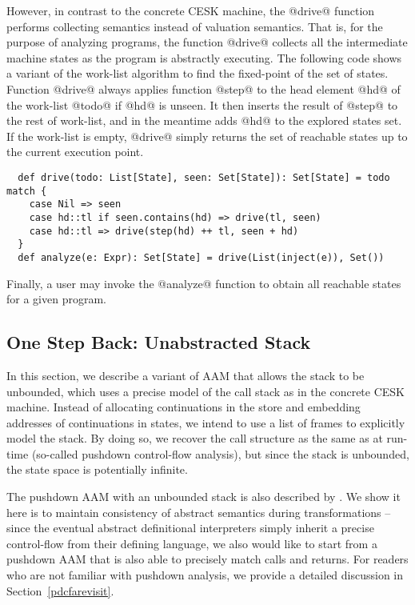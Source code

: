 \documentclass[acmsmall, screen]{acmart}\settopmatter{}
\begin{document}
However, in contrast to the concrete CESK machine, the @drive@ function performs
collecting semantics instead of valuation semantics. That is, for the purpose of
analyzing programs, the function @drive@ collects all the intermediate machine states
as the program is abstractly executing. The following code shows a variant of the
work-list algorithm to find the fixed-point of the set of states.
Function @drive@ always applies function @step@ to the head element @hd@ of
the work-list @todo@ if @hd@ is unseen. It then inserts the result of @step@ to
the rest of work-list, and in the meantime adds @hd@ to the explored states set.
If the work-list is empty, @drive@ simply returns the set of reachable states
up to the current execution point.

\begin{lstlisting}
  def drive(todo: List[State], seen: Set[State]): Set[State] = todo match {
    case Nil => seen
    case hd::tl if seen.contains(hd) => drive(tl, seen)
    case hd::tl => drive(step(hd) ++ tl, seen + hd)
  }
  def analyze(e: Expr): Set[State] = drive(List(inject(e)), Set())
\end{lstlisting}

Finally, a user may invoke the @analyze@ function to obtain all reachable states for
a given program.


\subsection{One Step Back: Unabstracted Stack} \label{unabs}

In this section, we describe a variant of AAM that allows the stack to be unbounded,
which uses a precise model of the call stack as in the concrete CESK machine.
Instead of allocating continuations in the store and embedding addresses of
continuations in states, we intend to use a list of frames to explicitly model
the stack. By doing so, we recover the call structure as the same as at run-time
(so-called pushdown control-flow analysis), but since the stack is unbounded,
the state space is potentially infinite.

The pushdown AAM with an unbounded stack is also described by \citeauthor{van2012systematic}
\cite{van2012systematic}.
We show it here is to maintain consistency of abstract semantics during
transformations -- since the eventual abstract definitional interpreters simply inherit
a precise control-flow from their defining language, we also would like to start from a
pushdown AAM that is also able to precisely match calls and returns.
For readers who are not familiar with pushdown analysis, we provide a detailed discussion
in Section~\ref{pdcfarevisit}.
\end{document}
